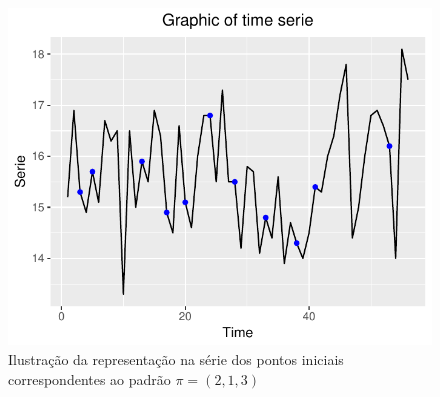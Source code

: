 \documentclass[journal,a4paper,11pt]{IEEEtran}
\begin{document}
\begin{figure}[!hbt]
	\centering
	\includegraphics[width=0.7\columnwidth]{Rplot04}        
     \caption{Ilustração da representação na série dos pontos iniciais correspondentes ao padrão $\pi = (2,1,3)$ }
\end{figure}




\end{document}
